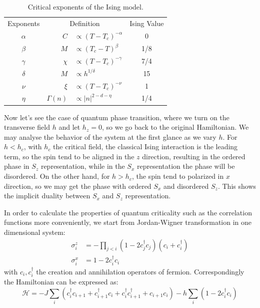 \documentclass{article}
\theoremstyle{plain} \newtheorem{thm}{Theorem}[section]
\theoremstyle{definition} \newtheorem{df}{Definition}[section]
\theoremstyle{definition} \newtheorem{eg}{Example}
\theoremstyle{remark} \newtheorem*{rmk}{Remark}
\begin{document}
\begin{table}[htpb]
  \centering
  \caption{Critical exponents of the Ising model.}
  \label{tab:critical_exponents}
  \begin{tabular}{crlc}
    \toprule
    Exponents & \multicolumn{2}{c}{Definition} & Ising Value \\
    $\alpha$ & $C$ & $ \propto (T-T_c)^{-\alpha}$ & 0 \\
    $\beta$ & $M$ & $ \propto (T_c-T)^\beta$ & 1/8 \\
    $\gamma$ & $\chi$ & $ \propto (T-T_c)^{-\gamma}$ & 7/4 \\
    $\delta$ & $M$ & $ \propto h^{1/\delta}$ & 15 \\
    \midrule
    $\nu$ & $\xi$ & $ \propto (T-T_c)^{-\nu}$ & 1 \\
    $\eta$ & $\varGamma(n)$ & $ \propto |n|^{2-d-\eta}$ & 1/4 \\
    \bottomrule
  \end{tabular}
\end{table}

	Now let's see the case of quantum phase transition, where we turn on the transverse field $h$ and let $h_z=0$, so we go back to the original Hamiltonian. We may analyse the behavior of the system at the first glance as we vary $h$. For $h<h_c$, with $h_c$ the critical field, the classical Ising interaction is the leading term, so the spin tend to be aligned in the $z$ direction, resulting in the ordered phase in $S_z$ representation, while in the $S_x$ representation the phase will be disordered. On the other hand, for $h>h_c$, the spin tend to polarized in $x$ direction, so we may get the phase with ordered $S_x$ and disordered $S_z$. This shows the implicit duality between $S_x$ and $S_z$ representation.
	
	In order to calculate the properties of quantum criticality such as the correlation functions more conveniently, we start from Jordan-Wigner transformation in one dimensional system:
		\begin{align}
		\sigma_i^z&=-\prod_{j<i}(1-2c_j^{\dagger}c_j)(c_i+c_i^{\dagger})\\
		\sigma_i^x&=1-2c_i^{\dagger}c_i
		\end{align}
	with $c_i,c_i^{\dagger}$ the creation and annihilation operators of fermion. Correspondingly the Hamiltonian can be expressed as:
	\begin{equation}
		\mathcal{H}=-J\sum_i(c_i^{\dagger}c_{i+1}+c_{i+1}^{\dagger}c_i+c_i^{\dagger}c_{i+1}^{\dagger}+c_{i+1}c_i)-h\sum_i(1-2c_i^{\dagger}c_i)
	\end{equation}
	
\end{document}
